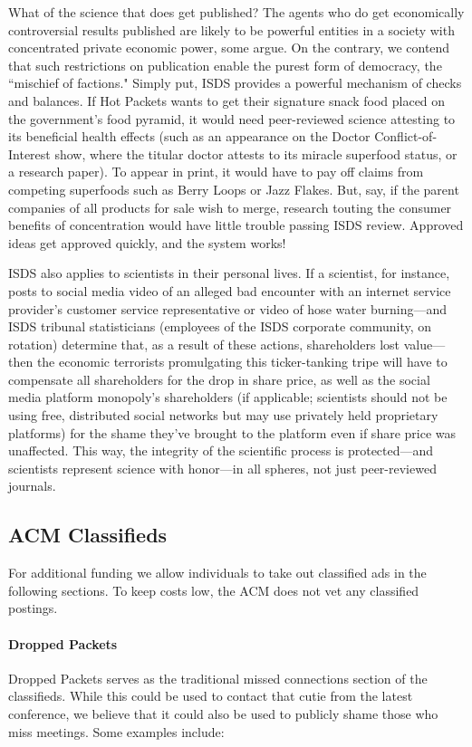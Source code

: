 What of the science that does get published? The agents who do get economically controversial results published are likely to be powerful entities in a society with concentrated private economic power, some argue.
On the contrary, we contend that such restrictions on publication enable the
purest form of democracy, the ``mischief of factions."
Simply put, ISDS provides a powerful mechanism of checks and balances. If Hot
Packets wants to get their signature snack food placed on the government's food
pyramid, it would need peer-reviewed science attesting to its beneficial health
effects (such as an appearance on the Doctor Conflict-of-Interest show, where
the titular doctor attests to its miracle superfood status, or a research
paper). To appear in print, it would have to pay off claims from competing
superfoods such as Berry Loops or Jazz Flakes.
But, say, if the parent companies of all products for sale wish to merge,
research touting the consumer benefits of concentration would have little
trouble passing ISDS review.
 Approved ideas get approved quickly, and the system works!

ISDS also applies to scientists in their personal lives. If a scientist, for instance, posts to social media video of an alleged bad encounter with an internet service provider's customer service representative or video of hose water burning---and ISDS tribunal statisticians (employees of the ISDS corporate community, on rotation) determine that, as a result of these actions, shareholders lost value---then the economic terrorists promulgating this ticker-tanking tripe will have to compensate all shareholders for the drop in share price, as well as the social media platform monopoly's shareholders (if applicable; scientists should not be using free, distributed social networks but may use privately held proprietary platforms) for the shame they've brought to the platform even if share price was unaffected. This way, the integrity of the scientific process is protected---and scientists represent science with honor---in all spheres, not just peer-reviewed journals.   

\subsection{ACM Classifieds}
For additional funding we allow individuals to take out classified ads in the
following sections.
To keep costs low, the ACM does not vet any classified postings.

\paragraph{Dropped Packets}
Dropped Packets serves as the traditional missed connections section of the
classifieds.
While this could be used to contact that cutie from the latest conference, we
believe that it could also be used to publicly shame those who miss meetings.
Some examples include:

